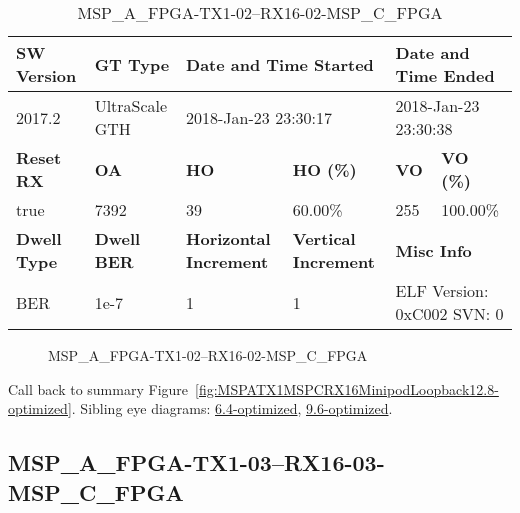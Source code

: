 \begin{table}[h]
\centering
\caption{MSP\_A\_FPGA-TX1-02--RX16-02-MSP\_C\_FPGA}
\label{tab:MSPAFPGATX102RX1602MSPCFPGA12.8-optimized}
\begin{tabular}{@{}|l|l|l|l|l|l|@{}}
\toprule
\textbf{SW Version}                & \textbf{GT Type}   & \multicolumn{2}{l|}{\textbf{Date and Time Started}}            & \multicolumn{2}{l|}{\textbf{Date and Time Ended}}        \\ \midrule
2017.2                       & UltraScale GTH          & \multicolumn{2}{l|}{2018-Jan-23 23:30:17}                   & \multicolumn{2}{l|}{2018-Jan-23 23:30:38}               \\ \midrule
\textbf{Reset RX}                  & \textbf{OA} & \textbf{HO}   & \textbf{HO (\%)} & \textbf{VO} & \textbf{VO (\%)} \\ \midrule
true & 7392        & 39          & 60.00\%        & 255        & 100.00\%       \\ \midrule
\textbf{Dwell Type}                & \textbf{Dwell BER} & \textbf{Horizontal Increment} & \textbf{Vertical Increment}    & \multicolumn{2}{l|}{\textbf{Misc Info}}                  \\ \midrule
BER                            & 1e-7        & 1        & 1           & \multicolumn{2}{l|}{ELF Version: 0xC002 SVN: 0}                         \\ \bottomrule
\end{tabular}
\end{table}

\begin{figure}[h]
\caption{MSP\_A\_FPGA-TX1-02--RX16-02-MSP\_C\_FPGA} \label{fig:MSPAFPGATX102RX1602MSPCFPGA12.8-optimized}
\end{figure}

Call back to summary Figure~\ref{fig:MSPATX1MSPCRX16MinipodLoopback12.8-optimized}.
Sibling eye diagrams: \hyperref[sec:MSPAFPGATX102RX1602MSPCFPGA6.4-optimized]{6.4-optimized}, \hyperref[sec:MSPAFPGATX102RX1602MSPCFPGA9.6-optimized]{9.6-optimized}.

\clearpage
\newpage


\subsection{MSP\_A\_FPGA-TX1-03--RX16-03-MSP\_C\_FPGA}\label{sec:MSPAFPGATX103RX1603MSPCFPGA12.8-optimized}

